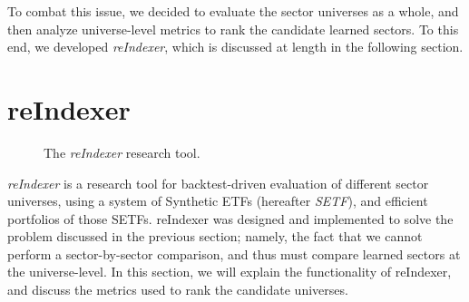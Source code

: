 \documentclass[../main.tex]{subfiles}
\begin{document}
To combat this issue, we decided to evaluate the sector universes as a whole, and then analyze universe-level metrics to rank the candidate learned sectors. To this end, we developed \textit{reIndexer}, which is discussed at length in the following section.

\section{reIndexer}

\begin{figure}
    \centering
    \vspace{\wrapfigadjustment}
    \caption{The \textit{reIndexer} research tool.}
    \label{fig:candidate_universe_ranking:reindexer_logo}
\end{figure}

\textit{reIndexer} is a research tool for backtest-driven evaluation of different sector universes, using a system of Synthetic ETFs (hereafter \textit{SETF}), and efficient portfolios of those SETFs. reIndexer was designed and implemented to solve the problem discussed in the previous section; namely, the fact that we cannot perform a sector-by-sector comparison, and thus must compare learned sectors at the universe-level. In this section, we will explain the functionality of reIndexer, and discuss the metrics used to rank the candidate universes.
\end{document}

